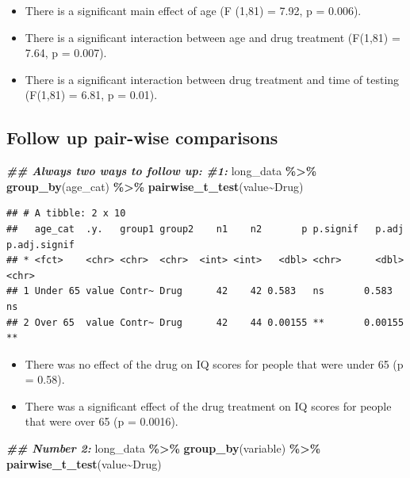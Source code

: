 \documentclass[
]{book}
\newenvironment{Shaded}{\begin{snugshade}}{\end{snugshade}}
\newcommand{\DocumentationTok}[1]{\textcolor[rgb]{0.56,0.35,0.01}{\textbf{\textit{#1}}}}
\newcommand{\FunctionTok}[1]{\textcolor[rgb]{0.13,0.29,0.53}{\textbf{#1}}}
\newcommand{\NormalTok}[1]{#1}
\newcommand{\SpecialCharTok}[1]{\textcolor[rgb]{0.81,0.36,0.00}{\textbf{#1}}}
\providecommand{\tightlist}{%
  \setlength{\itemsep}{0pt}\setlength{\parskip}{0pt}}
\begin{document}
\begin{itemize}
\tightlist
\item
  There is a significant main effect of age (F (1,81) = 7.92, p = 0.006).
\item
  There is a significant interaction between age and drug treatment (F(1,81) = 7.64, p = 0.007).
\item
  There is a significant interaction between drug treatment and time of testing (F(1,81) = 6.81, p = 0.01).
\end{itemize}

\subsection*{Follow up pair-wise comparisons}\label{follow-up-pair-wise-comparisons}

\begin{Shaded}
\begin{Highlighting}[]
\DocumentationTok{\#\# Always two ways to follow up: \#1:}
\NormalTok{long\_data }\SpecialCharTok{\%\textgreater{}\%}
  \FunctionTok{group\_by}\NormalTok{(age\_cat) }\SpecialCharTok{\%\textgreater{}\%}
  \FunctionTok{pairwise\_t\_test}\NormalTok{(value}\SpecialCharTok{\textasciitilde{}}\NormalTok{Drug)}
\end{Highlighting}
\end{Shaded}

\begin{verbatim}
## # A tibble: 2 x 10
##   age_cat  .y.   group1 group2    n1    n2       p p.signif   p.adj p.adj.signif
## * <fct>    <chr> <chr>  <chr>  <int> <int>   <dbl> <chr>      <dbl> <chr>       
## 1 Under 65 value Contr~ Drug      42    42 0.583   ns       0.583   ns          
## 2 Over 65  value Contr~ Drug      42    44 0.00155 **       0.00155 **
\end{verbatim}

\begin{itemize}
\tightlist
\item
  There was no effect of the drug on IQ scores for people that were under 65 (p = 0.58).
\item
  There was a significant effect of the drug treatment on IQ scores for people that were over 65 (p = 0.0016).
\end{itemize}

\begin{Shaded}
\begin{Highlighting}[]
\DocumentationTok{\#\# Number 2: }
\NormalTok{long\_data }\SpecialCharTok{\%\textgreater{}\%}
  \FunctionTok{group\_by}\NormalTok{(variable) }\SpecialCharTok{\%\textgreater{}\%}
  \FunctionTok{pairwise\_t\_test}\NormalTok{(value}\SpecialCharTok{\textasciitilde{}}\NormalTok{Drug)}
\end{Highlighting}
\end{Shaded}
\end{document}

